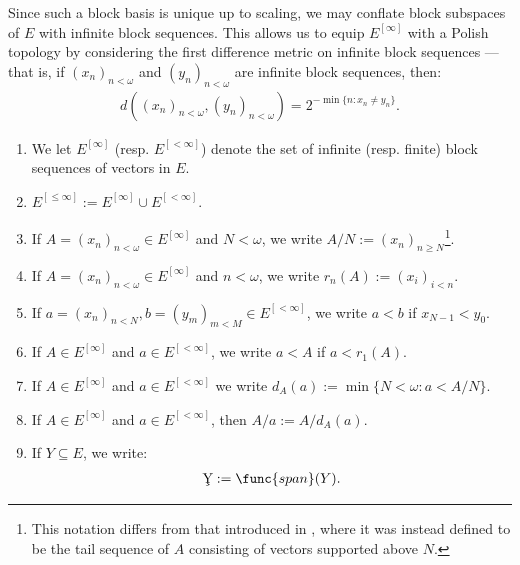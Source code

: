 \documentclass[11pt,reqno]{amsart}
\begin{document}
Since such a block basis is unique up to scaling, we may conflate block subspaces of $E$ with infinite block sequences. This allows us to equip $E^{[\infty]}$ with a Polish topology by considering the first difference metric on infinite block sequences --- that is, if $(x_n)_{n<\omega}$ and $(y_n)_{n<\omega}$ are infinite block sequences, then:
\begin{align*}
    d((x_n)_{n<\omega},(y_n)_{n<\omega}) = 2^{-\min\{n : x_n \neq y_n\}}.
\end{align*}

\begin{notation}
\label{not:notations}
\hfill
    \begin{enumerate}
        \item We let $E^{[\infty]}$ (resp. $E^{[<\infty]}$) denote the set of infinite (resp. finite) block sequences of vectors in $E$. 

        \item $E^{[\leq\infty]} := E^{[\infty]} \cup E^{[<\infty]}$.

        \item If $A = (x_n)_{n<\omega} \in E^{[\infty]}$ and $N < \omega$, we write $A/N := (x_n)_{n \geq N}$\footnote{This notation differs from that introduced in \cite{S23}, where it was instead defined to be the tail sequence of $A$ consisting of vectors supported above $N$.}.
        
        \item If $A = (x_n)_{n<\omega} \in E^{[\infty]}$ and $n < \omega$, we write $r_n(A) := (x_i)_{i<n}$.
        
        \item If $a = (x_n)_{n<N},b = (y_m)_{m<M} \in E^{[<\infty]}$, we write $a < b$ if $x_{N-1} < y_0$.
        
        \item If $A \in E^{[\infty]}$ and $a \in E^{[<\infty]}$, we write $a < A$ if $a < r_1(A)$.
        
        \item If $A \in E^{[\infty]}$ and $a \in E^{[<\infty]}$ we write $d_A(a) := \min\{N < \omega : a < A/N\}$.

        \item If $A \in E^{[\infty]}$ and $a \in E^{[<\infty]}$, then $A/a := A/d_A(a)$.
        
        \item If $Y \subseteq E$, we write:
        \begin{align*}
            \c{Y} := \func{span}(Y).
        \end{align*}


\end{enumerate}
\end{notation}
\end{document}
